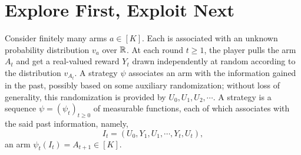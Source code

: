 \documentclass[letterpaper,11pt]{article}
\begin{document}
\section{Explore First, Exploit Next}

Consider finitely many arms $a \in [K]$. Each is associated with an unknown probability distribution $v_a$ over $\mathbb{R}$. At each round $t \geq 1$, the player pulls the arm $A_t$ and get a real-valued reward $Y_t$ drawn independently at random according to the distribution $v_{A_t}$. A strategy $\psi$ associates an arm with the information gained in the past, possibly based on some auxiliary randomization; without loss of generality, this randomization is provided by $U_0, U_1, U_2, \cdots$. A strategy is a sequence $\psi = (\psi_{t})_{t \geq 0}$ of measurable functions, each of  which associates with the said past information, namely,
\begin{equation*}
    I_t = \left(U_0, Y_1, U_1, \cdots, Y_t, U_t\right),
\end{equation*}
an arm $\psi_t(I_t) = A_{t+1} \in [K]$. 

\appendix





\end{document}
